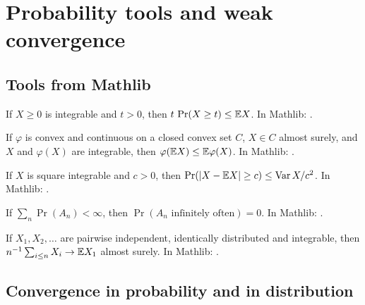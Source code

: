 \chapter{Probability tools and weak convergence}
\label{chap:weak-convergence}

\section{Tools from Mathlib}

\begin{theorem}
  \label{thm:han-2-7}
  \mathlibok
  If $X\ge0$ is integrable and $t>0$, then $t\,\Pr(X\ge t)\le\mathbb{E} X$.
  In Mathlib: .
\end{theorem}

\begin{theorem}
  \label{thm:han-2-9}
  \mathlibok
  If $\varphi$ is convex and continuous on a closed convex set $C$, $X\in C$ almost surely, and $X$ and $\varphi(X)$ are integrable, then $\varphi(\mathbb{E} X)\le\mathbb{E}\varphi(X)$.
  In Mathlib: .
\end{theorem}

\begin{lemma}[Chebyshev]
  \label{lem:chebyshev}
  \mathlibok
  If $X$ is square integrable and $c>0$, then $\Pr(|X-\mathbb{E} X|\ge c)\le\operatorname{Var} X/c^2$.
  In Mathlib: .
\end{lemma}

\begin{lemma}
  \label{lem:borel-cantelli}
  \mathlibok
  If $\sum_n\Pr(A_n)<\infty$, then $\Pr(A_n\text{ infinitely often})=0$.
  In Mathlib: .
\end{lemma}

\begin{theorem}
  \label{thm:strong-law}
  \mathlibok
  If $X_1,X_2,\dots$ are pairwise independent, identically distributed and integrable, then $n^{-1}\sum_{i\le n}X_i\to\mathbb{E} X_1$ almost surely.
  In Mathlib: .
\end{theorem}

\section{Convergence in probability and in distribution}

